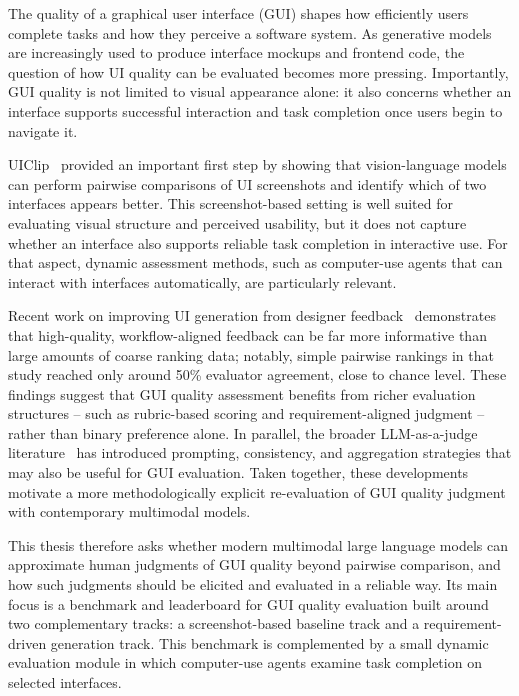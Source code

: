 \documentclass[pdflatex,sn-mathphys-num]{sn-jnl}
\begin{document}
The quality of a graphical user interface (GUI) shapes how efficiently users complete
tasks and how they perceive a software system. As generative models are increasingly
used to produce interface mockups and frontend code, the question of how UI quality can
be evaluated becomes more pressing. Importantly, GUI quality is not limited to visual
appearance alone: it also concerns whether an interface supports successful interaction
and task completion once users begin to navigate it.

UIClip~\cite{uiclip} provided an important first step by showing that vision-language
models can perform pairwise comparisons of UI screenshots and identify which of two
interfaces appears better. This screenshot-based setting is well suited for evaluating
visual structure and perceived usability, but it does not capture whether an interface
also supports reliable task completion in interactive use. For that aspect, dynamic
assessment methods, such as computer-use agents that can interact with interfaces
automatically, are particularly relevant.

Recent work on improving UI generation from designer feedback~\cite{designer_feedback}
demonstrates that high-quality, workflow-aligned feedback can be far more informative
than large amounts of coarse ranking data; notably, simple pairwise rankings in that
study reached only around 50\% evaluator agreement, close to chance level. These
findings suggest that GUI quality assessment benefits from richer evaluation
structures -- such as rubric-based scoring and requirement-aligned judgment -- rather
than binary preference alone. In parallel, the broader LLM-as-a-judge
literature~\cite{llm_judge} has introduced prompting, consistency, and aggregation
strategies that may also be useful for GUI evaluation. Taken together, these
developments motivate a more methodologically explicit re-evaluation of GUI quality
judgment with contemporary multimodal models.

This thesis therefore asks whether modern multimodal large language models can
approximate human judgments of GUI quality beyond pairwise comparison, and how such
judgments should be elicited and evaluated in a reliable way. Its main focus is a
benchmark and leaderboard for GUI quality evaluation built around two complementary
tracks: a screenshot-based baseline track and a requirement-driven generation track.
This benchmark is complemented by a small dynamic evaluation module in which
computer-use agents examine task completion on selected interfaces.
\end{document}
